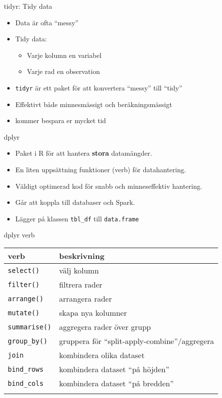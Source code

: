 \documentclass[
  10pt,
  ignorenonframetext,
  handout]{beamer}
\providecommand{\tightlist}{%
  \setlength{\itemsep}{0pt}\setlength{\parskip}{0pt}}
\begin{document}
\begin{frame}[fragile]{tidyr: Tidy data}
\label{tidyr-tidy-data}
\begin{itemize}
\tightlist
\item
  Data är ofta ``messy''
\item
  Tidy data:

  \begin{itemize}
  \tightlist
  \item
    Varje kolumn en variabel
  \item
    Varje rad en observation
  \end{itemize}
\item
  \texttt{tidyr} är ett paket för att konvertera ``messy'' till ``tidy''
\item
  Effektivt både minnesmässigt och beräkningsmässigt
\item
  kommer bespara er mycket tid
\end{itemize}
\end{frame}

\begin{frame}[fragile]{dplyr}
\label{dplyr}
\begin{itemize}
\tightlist
\item
  Paket i R för att hantera \textbf{stora} datamängder.
\item
  En liten uppsättning funktioner (verb) för datahantering.
\item
  Väldigt optimerad kod för snabb och minneseffektiv hantering.
\item
  Går att koppla till databaser och Spark.
\item
  Lägger på klassen \texttt{tbl\_df} till \texttt{data.frame}
\end{itemize}
\end{frame}

\begin{frame}[fragile]{dplyr verb}
\label{dplyr-verb}
\begin{longtable}[]{@{}ll@{}}
\toprule\noalign{}
verb & beskrivning \\
\midrule\noalign{}
\endhead
\texttt{select()} & välj kolumn \\
\texttt{filter()} & filtrera rader \\
\texttt{arrange()} & arrangera rader \\
\texttt{mutate()} & skapa nya kolumner \\
\texttt{summarise()} & aggregera rader över grupp \\
\texttt{group\_by()} & gruppera för ``split-apply-combine''/aggregera \\
\texttt{join} & kombindera olika dataset \\
\texttt{bind\_rows} & kombindera dataset ``på höjden'' \\
\texttt{bind\_cols} & kombindera dataset ``på bredden'' \\
\bottomrule\noalign{}
\end{longtable}
\end{frame}
\end{document}
